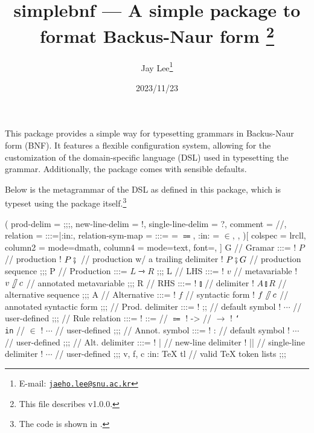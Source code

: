\documentclass[11pt]{article}
\title{%
  \textsf{simplebnf} --- A simple package to format Backus-Naur form%
  \footnote{This file describes v1.0.0.}}
\author{Jay Lee\footnote{E-mail: %
  \href{mailto:jaeho.lee@snu.ac.kr}{\texttt{jaeho.lee@snu.ac.kr}}}}
\date{2023/11/23}
\begin{document}
\maketitle


\vfill
This package provides a simple way for typesetting grammars in Backus-Naur form (BNF).
It features a flexible configuration system, allowing for the customization of the domain-specific language (DSL) used in typesetting the grammar.
Additionally, the package comes with sensible defaults.

Below is the metagrammar of the DSL as defined in this package, which is typeset using the package itself.\footnote{The code is shown in .}
\begin{tcolorbox}
  \begin{center}
    \begin{bnf}(
      prod-delim = ;;;,
      new-line-delim = !,
      single-line-delim = ?,
      comment = //,
      relation = {:::=|:in:},
      relation-sym-map =
        {
          {:::=} = $\Coloneqq$,
          {:in:} = $\in$,
        },
    )[
      colspec = lrcll,
      column{2} = {mode=dmath},
      column{4} = {mode=text, font=\ttfamily},
    ]
      G // Gramar :::=
      ! $P$ // production
      ! $P \fatsemi {}$ // production w/ a trailing delimiter
      ! $P \fatsemi G$ // production sequence
    ;;;
      P // Production :::= $L \rightarrowtriangle R$
    ;;;
      L // LHS :::=
      ! $v$ // metavariable
      ! $v\!\fatslash\,c$ // annotated metavariable
    ;;;
      R // RHS :::=
      ! $\talloblong$ // delimiter
      ! $A \talloblong R$ // alternative sequence
    ;;;
      A // Alternative :::=
      ! $f$ // syntactic form
      ! $f\!\fatslash\,c$ // annotated syntactic form
    ;;;
      \fatsemi // Prod. delimiter :::=
      ! ;; // default symbol
      ! $\cdots$ // user-defined
    ;;;
      \rightarrowtriangle // Rule relation :::=
      ! ::= // $\Coloneqq$
      ! -> // $\to$
      ! \texttt{\char`\\in} // $\in$
      ! $\cdots$ // user-defined
    ;;;
      \fatslash // Annot. symbol :::=
      ! : // default symbol
      ! $\cdots$ // user-defined
    ;;;
      \talloblong // Alt. delimiter :::=
      ! | // new-line delimiter
      ! || // single-line delimiter
      ! $\cdots$ // user-defined
    ;;;
      v, f, c :in: \textsf{\TeX{} tl} // valid \TeX{} token lists
    ;;;
    \end{bnf}
  \end{center}
\end{tcolorbox}
\vfill
\end{document}
